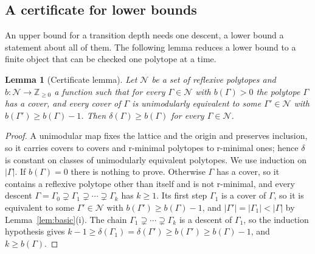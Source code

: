 \documentclass[11pt]{amsart}
\newtheorem{lemma}[theorem]{Lemma}
\theoremstyle{definition}
\theoremstyle{remark}
\begin{document}
\subsection{A certificate for lower bounds}\label{ssec:certificate}

An upper bound for a transition depth needs one descent, a lower bound a
statement about all of them. The following lemma reduces a lower bound to
a finite object that can be checked one polytope at a time.

\begin{lemma}[Certificate lemma]\label{lem:certificate}
Let $\mathcal{N}$ be a set of reflexive polytopes and
$b\colon\mathcal{N}\to\mathbb{Z}_{\ge0}$ a function such that for every
$\Gamma\in\mathcal{N}$ with $b(\Gamma)>0$ the polytope $\Gamma$ has a
cover, and every cover of $\Gamma$ is unimodularly equivalent to some
$\Gamma'\in\mathcal{N}$ with $b(\Gamma')\ge b(\Gamma)-1$. Then
$\delta(\Gamma)\ge b(\Gamma)$ for every $\Gamma\in\mathcal{N}$.
\end{lemma}

\begin{proof}
A unimodular map fixes the lattice and the origin and preserves inclusion,
so it carries covers to covers and r-minimal polytopes to r-minimal ones;
hence $\delta$ is constant on classes of unimodularly equivalent
polytopes. We use induction on $|\Gamma|$. If $b(\Gamma)=0$ there is
nothing to prove. Otherwise $\Gamma$ has a cover, so it contains a
reflexive polytope other than itself and is not r-minimal, and every
descent $\Gamma=\Gamma_0\supsetneq\Gamma_1\supsetneq\cdots\supsetneq
\Gamma_k$ has $k\ge1$. Its first step $\Gamma_1$ is a cover of $\Gamma$,
so it is equivalent to some $\Gamma'\in\mathcal{N}$ with $b(\Gamma')\ge
b(\Gamma)-1$, and $|\Gamma'|=|\Gamma_1|<|\Gamma|$ by
Lemma~\ref{lem:basic}(i). The chain $\Gamma_1\supsetneq\cdots\supsetneq
\Gamma_k$ is a descent of $\Gamma_1$, so the induction hypothesis gives
$k-1\ge\delta(\Gamma_1)=\delta(\Gamma')\ge b(\Gamma')\ge b(\Gamma)-1$, and
$k\ge b(\Gamma)$.
\end{proof}
\end{document}
